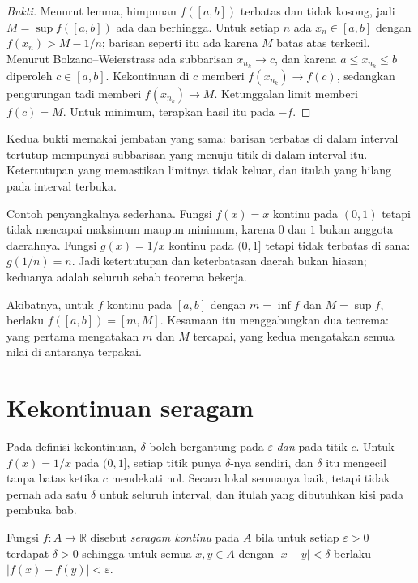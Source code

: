 \begin{proof}[Bukti]
Menurut lemma, himpunan $f([a,b])$ terbatas dan tidak kosong, jadi $M=\sup f([a,b])$
ada dan berhingga. Untuk setiap $n$ ada $x_{n}\in[a,b]$ dengan $f(x_{n})>M-1/n$;
barisan seperti itu ada karena $M$ batas atas terkecil. Menurut
Bolzano--Weierstrass ada subbarisan $x_{n_{k}}\to c$, dan karena
$a\le x_{n_{k}}\le b$ diperoleh $c\in[a,b]$. Kekontinuan di $c$ memberi
$f(x_{n_{k}})\to f(c)$, sedangkan pengurungan tadi memberi $f(x_{n_{k}})\to M$.
Ketunggalan limit memberi $f(c)=M$. Untuk minimum, terapkan hasil itu pada $-f$.
\end{proof}

Kedua bukti memakai jembatan yang sama: barisan terbatas di dalam interval tertutup
mempunyai subbarisan yang menuju titik di dalam interval itu. Ketertutupan yang
memastikan limitnya tidak keluar, dan itulah yang hilang pada interval terbuka.

Contoh penyangkalnya sederhana. Fungsi $f(x)=x$ kontinu pada $(0,1)$ tetapi tidak
mencapai maksimum maupun minimum, karena $0$ dan $1$ bukan anggota daerahnya. Fungsi
$g(x)=1/x$ kontinu pada $(0,1]$ tetapi tidak terbatas di sana: $g(1/n)=n$. Jadi
ketertutupan dan keterbatasan daerah bukan hiasan; keduanya adalah seluruh sebab
teorema bekerja.

Akibatnya, untuk $f$ kontinu pada $[a,b]$ dengan $m=\inf f$ dan $M=\sup f$, berlaku
$f([a,b])=[m,M]$. Kesamaan itu menggabungkan dua teorema: yang pertama mengatakan $m$
dan $M$ tercapai, yang kedua mengatakan semua nilai di antaranya terpakai.

\section{Kekontinuan seragam}

Pada definisi kekontinuan, $\delta$ boleh bergantung pada $\varepsilon$ \emph{dan}
pada titik $c$. Untuk $f(x)=1/x$ pada $(0,1]$, setiap titik punya $\delta$-nya
sendiri, dan $\delta$ itu mengecil tanpa batas ketika $c$ mendekati nol. Secara lokal
semuanya baik, tetapi tidak pernah ada satu $\delta$ untuk seluruh interval, dan itulah
yang dibutuhkan kisi pada pembuka bab.


\begin{definisi}
Fungsi $f\colon A\to\mathbb{R}$ disebut \emph{seragam kontinu} pada $A$ bila untuk
setiap $\varepsilon>0$ terdapat $\delta>0$ sehingga untuk semua $x,y\in A$ dengan
$|x-y|<\delta$ berlaku $|f(x)-f(y)|<\varepsilon$.
\end{definisi}


